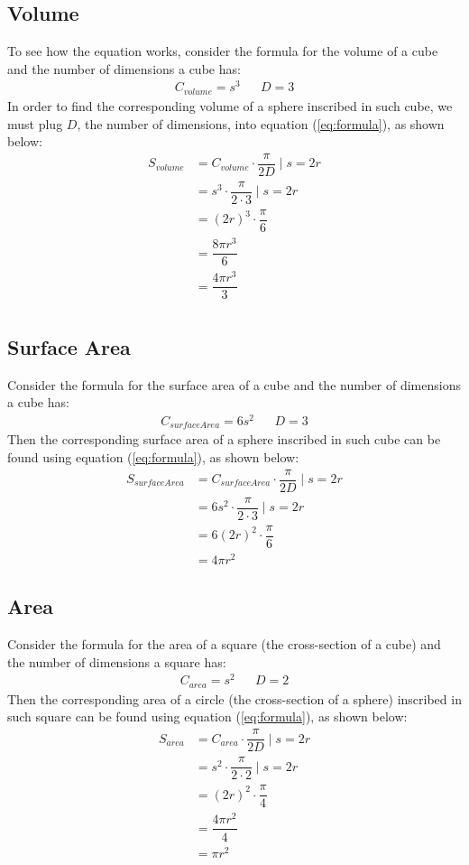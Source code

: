 \documentclass[12pt,letterpaper,twocolumn]{article}
\begin{document}
\subsection*{Volume}
To see how the equation works, consider the formula for the volume of a cube and the number of dimensions a cube has:
	\begin{align}
		C_{volume} = s^{3} && D =  3
	\end{align}
In order to find the corresponding volume of a sphere inscribed in such cube, we must plug $D$, the number of dimensions, into equation (\ref{eq:formula}), as shown below:
	\begin{align*}
		S_{volume} &= C_{volume} \cdot\dfrac{\pi}{2D} \mid  s=2r \\
		&= s^{3} \cdot\dfrac{\pi}{2\cdot 3} \mid s=2r\\
		&= (2r)^{3} \cdot\dfrac{\pi}{6} \\
		&= \dfrac{8\pi r^{3}}{6} \\
		&= \dfrac{4\pi r^{3}}{3} \\
	\end{align*}

\subsection*{Surface Area}
Consider the formula for the surface area of a cube and the number of dimensions a cube has:
	\begin{align}
		C_{surfaceArea} = 6s^{2} && D =  3
	\end{align}	
Then the corresponding surface area of a sphere inscribed in such cube can be found using equation (\ref{eq:formula}), as shown below:
	\begin{align*}
		S_{surfaceArea} &= C_{surfaceArea} \cdot\dfrac{\pi}{2D} \mid  s=2r \\
		&= 6s^{2} \cdot\dfrac{\pi}{2\cdot 3} \mid s=2r\\
		&= 6(2r)^{2} \cdot\dfrac{\pi}{6} \\
		&= 4\pi r^{2}
	\end{align*}

\subsection*{Area}
Consider the formula for the area of a square (the cross-section of a cube) and the number of dimensions a square has:
	\begin{align}
		C_{area} = s^{2} && D =  2
	\end{align}	
Then the corresponding area of a circle (the cross-section of a sphere) inscribed in such square can be found using equation (\ref{eq:formula}), as shown below:
	\begin{align*}
		S_{area} &= C_{area} \cdot\dfrac{\pi}{2D} \mid  s=2r \\
		&= s^{2} \cdot\dfrac{\pi}{2\cdot 2} \mid s=2r\\
		&= (2r)^{2} \cdot\dfrac{\pi}{4} \\
		&= \dfrac{4\pi r^{2}}{4} \\
		&= \pi r^{2}
	\end{align*}
\end{document}
